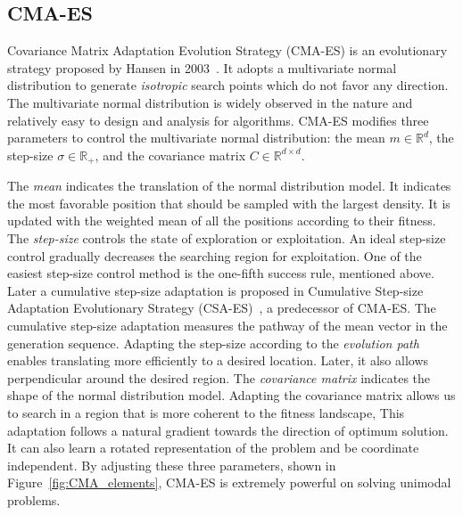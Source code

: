 \subsection{CMA-ES}
Covariance Matrix Adaptation Evolution Strategy (CMA-ES) is an evolutionary strategy 
proposed by Hansen in 2003~\cite{Hansen:2003:CMA_ES}.
It adopts a multivariate normal distribution to generate \textit{isotropic} search points which do not favor any direction.
The multivariate normal distribution is widely observed in the nature and relatively easy to design and analysis for algorithms.
CMA-ES modifies three parameters to control the multivariate normal distribution: 
the mean $m \in \mathbb{R}^d$, the step-size $\sigma \in \mathbb{R}_+$, and the covariance matrix $C \in \mathbb{R}^{d \times d}$.


The \textit{mean} indicates the translation of the normal distribution model.
It indicates the most favorable position that should be sampled with the largest density.
It is updated with the weighted mean of all the positions according to their fitness.
The \textit{step-size} controls the state of exploration or exploitation.
An ideal step-size control gradually decreases the searching region for exploitation.
One of the easiest step-size control method is the one-fifth success rule, mentioned above.
Later a cumulative step-size adaptation is proposed in 
Cumulative Step-size Adaptation Evolutionary Strategy (CSA-ES)~\cite{Hansen:2001:CSA_ES}, a predecessor of CMA-ES.
The cumulative step-size adaptation measures the pathway of the mean vector in the generation sequence.
Adapting the step-size according to the \textit{evolution path} enables translating more efficiently to a desired location.
Later, it also allows perpendicular around the desired region.
The \textit{covariance matrix} indicates the shape of the normal distribution model.
Adapting the covariance matrix allows us to search in a region that is more coherent to the fitness landscape, 
This adaptation follows a natural gradient towards the direction of optimum solution.
It can also learn a rotated representation of the problem and be coordinate independent. 
By adjusting these three parameters, shown in Figure~\ref{fig:CMA_elements}, CMA-ES is extremely powerful on solving unimodal problems.


